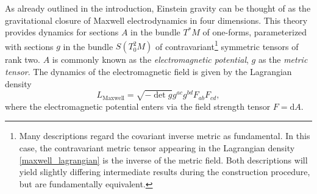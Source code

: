 As already outlined in the introduction, Einstein gravity can be thought of as the gravitational closure of Maxwell electrodynamics in four dimensions. This theory provides dynamics for sections $A$ in the bundle $T^\ast M$ of one-forms, parameterized with sections $g$ in the bundle $S(T^2_0M)$ of contravariant\footnote{Many descriptions regard the covariant inverse metric as fundamental. In this case, the contravariant metric tensor appearing in the Lagrangian density \eqref{maxwell_lagrangian} is the inverse of the metric field. Both descriptions will yield slightly differing intermediate results during the construction procedure, but are fundamentally equivalent.} symmetric tensors of rank two. $A$ is commonly known as the \emph{electromagnetic potential}, $g$ as the \emph{metric tensor}. The dynamics of the electromagnetic field is given by the Lagrangian density
\begin{equation}
  L_\text{Maxwell} = \sqrt{-\operatorname{det} g} g^{ac}g^{bd} F_{ab} F_{cd},
\end{equation}
where the electromagnetic potential enters via the field strength tensor $F = \mathrm dA$.

